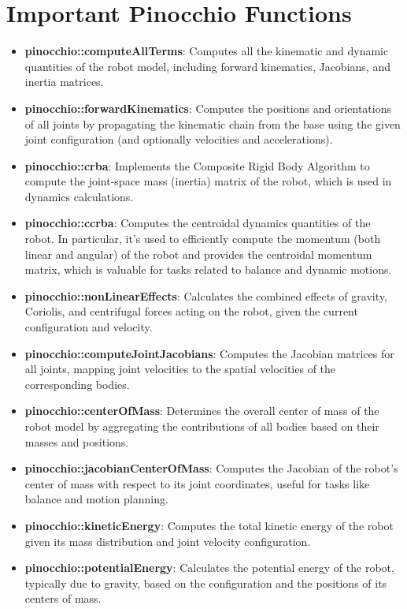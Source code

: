 \documentclass[10pt]{article}
\begin{document}
\section*{Important Pinocchio Functions}
\begin{itemize}
    \item \textbf{pinocchio::computeAllTerms}: Computes all the kinematic and dynamic quantities of the robot model, including forward kinematics, Jacobians, and inertia matrices.
    \item \textbf{pinocchio::forwardKinematics}: Computes the positions and orientations of all joints by propagating the kinematic chain from the base using the given joint configuration (and optionally velocities and accelerations).
    \item \textbf{pinocchio::crba}: Implements the Composite Rigid Body Algorithm to compute the joint-space mass (inertia) matrix of the robot, which is used in dynamics calculations.
    \item \textbf{pinocchio::ccrba}: Computes the centroidal dynamics quantities of the robot. In particular, it’s used to efficiently compute the momentum (both linear and angular) of the robot and provides the centroidal momentum matrix, which is valuable for tasks related to balance and dynamic motions.
    \item \textbf{pinocchio::nonLinearEffects}: Calculates the combined effects of gravity, Coriolis, and centrifugal forces acting on the robot, given the current configuration and velocity.
    \item \textbf{pinocchio::computeJointJacobians}: Computes the Jacobian matrices for all joints, mapping joint velocities to the spatial velocities of the corresponding bodies.
    \item \textbf{pinocchio::centerOfMass}: Determines the overall center of mass of the robot model by aggregating the contributions of all bodies based on their masses and positions.
    \item \textbf{pinocchio::jacobianCenterOfMass}: Computes the Jacobian of the robot’s center of mass with respect to its joint coordinates, useful for tasks like balance and motion planning.
    \item \textbf{pinocchio::kineticEnergy}: Computes the total kinetic energy of the robot given its mass distribution and joint velocity configuration.
    \item \textbf{pinocchio::potentialEnergy}: Calculates the potential energy of the robot, typically due to gravity, based on the configuration and the positions of its centers of mass.
\end{itemize}
\end{document}
